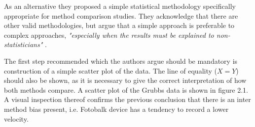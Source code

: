 \documentclass[12pt, a4paper]{report}
\begin{document}
As an alternative they proposed a simple statistical methodology specifically appropriate for method comparison studies. They
acknowledge that there are other valid methodologies, but argue that a simple approach is preferable to complex approaches,
\emph{"especially when the results must be explained to non-statisticians"} \citep*{BA83}.

The first step recommended which the authors argue should be mandatory is construction of a simple scatter plot of the data.
The line of equality ($X=Y$) should also be shown, as it is necessary to give the correct interpretation of how both methods
compare. A scatter plot of the Grubbs data is shown in figure 2.1. A visual inspection thereof confirms the previous conclusion that
there is an inter method bias present, i.e. Fotobalk device has a tendency to record a lower velocity.

\end{document}

